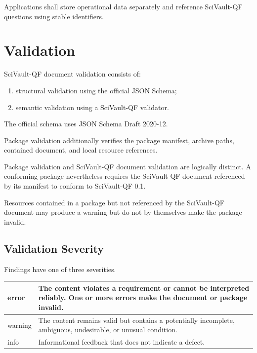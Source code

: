 \documentclass[11pt]{article}
\begin{document}
	Applications shall store operational data separately and reference
	SciVault-QF questions using stable identifiers.
	
	\section{Validation}
	
	SciVault-QF document validation consists of:
	
	\begin{enumerate}
		\item structural validation using the official JSON Schema;
		\item semantic validation using a SciVault-QF validator.
	\end{enumerate}
	
	The official schema uses JSON Schema Draft 2020-12.
	
	Package validation additionally verifies the package manifest, archive paths,
	contained document, and local resource references.
	
	Package validation and SciVault-QF document validation are logically distinct.
	A conforming package nevertheless requires the SciVault-QF document referenced
	by its manifest to conform to SciVault-QF 0.1.
	
	Resources contained in a package but not referenced by the SciVault-QF document
	may produce a warning but do not by themselves make the package invalid.
	
	\subsection{Validation Severity}
	
	Findings have one of three severities.
	
	\begin{longtable}{|>{\ttfamily}p{2.5cm}|p{11cm}|}
		\hline
		error &
		The content violates a requirement or cannot be interpreted reliably.
		One or more errors make the document or package invalid. \\ \hline
		
		warning &
		The content remains valid but contains a potentially incomplete, ambiguous,
		undesirable, or unusual condition. \\ \hline
		
		info &
		Informational feedback that does not indicate a defect. \\ \hline
	\end{longtable}
	
\end{document}
